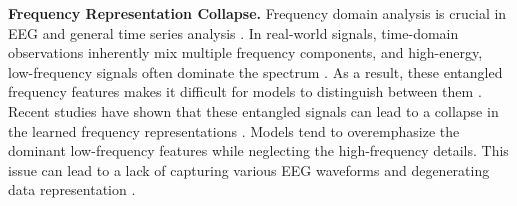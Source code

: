     
\noindent\textbf{Frequency Representation Collapse. }
Frequency domain analysis is crucial in EEG and general time series analysis \cite{almost_harmonics_2020, Autoformer, Timesnet, Etsformer}. 
In real-world signals, time-domain observations inherently mix multiple frequency components, and high-energy, low-frequency signals often dominate the spectrum \cite{time_frequency_decomposition_1998, long_and_short_SiGIR18}. 
As a result, these entangled frequency features makes it difficult for models to distinguish between them \cite{ICMLFedformer, Piao2024fredformer}.
Recent studies have shown that these entangled signals can lead to a collapse in the learned frequency representations \cite{Zhi_Qin_John_Xu_2020_frequencyprinciple, Piao2024fredformer}. 
Models tend to overemphasize the dominant low-frequency features while neglecting the high-frequency details.
This issue can lead to a lack of capturing various EEG waveforms and degenerating data representation \cite{howTransWork_2022_ICLR}.
